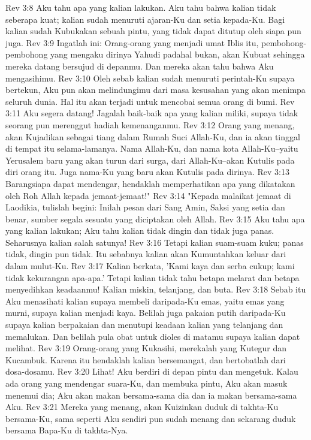 Rev 3:8  Aku tahu apa yang kalian lakukan. Aku tahu bahwa kalian tidak seberapa kuat; kalian sudah menuruti ajaran-Ku dan setia kepada-Ku. Bagi kalian sudah Kubukakan sebuah pintu, yang tidak dapat ditutup oleh siapa pun juga.
Rev 3:9  Ingatlah ini: Orang-orang yang menjadi umat Iblis itu, pembohong-pembohong yang mengaku dirinya Yahudi padahal bukan, akan Kubuat sehingga mereka datang bersujud di depanmu. Dan mereka akan tahu bahwa Aku mengasihimu.
Rev 3:10  Oleh sebab kalian sudah menuruti perintah-Ku supaya bertekun, Aku pun akan melindungimu dari masa kesusahan yang akan menimpa seluruh dunia. Hal itu akan terjadi untuk mencobai semua orang di bumi.
Rev 3:11  Aku segera datang! Jagalah baik-baik apa yang kalian miliki, supaya tidak seorang pun merenggut hadiah kemenanganmu.
Rev 3:12  Orang yang menang, akan Kujadikan sebagai tiang dalam Rumah Suci Allah-Ku, dan ia akan tinggal di tempat itu selama-lamanya. Nama Allah-Ku, dan nama kota Allah-Ku--yaitu Yerusalem baru yang akan turun dari surga, dari Allah-Ku--akan Kutulis pada diri orang itu. Juga nama-Ku yang baru akan Kutulis pada dirinya.
Rev 3:13  Barangsiapa dapat mendengar, hendaklah memperhatikan apa yang dikatakan oleh Roh Allah kepada jemaat-jemaat!"
Rev 3:14  "Kepada malaikat jemaat di Laodikia, tulislah begini: Inilah pesan dari Sang Amin, Saksi yang setia dan benar, sumber segala sesuatu yang diciptakan oleh Allah.
Rev 3:15  Aku tahu apa yang kalian lakukan; Aku tahu kalian tidak dingin dan tidak juga panas. Seharusnya kalian salah satunya!
Rev 3:16  Tetapi kalian suam-suam kuku; panas tidak, dingin pun tidak. Itu sebabnya kalian akan Kumuntahkan keluar dari dalam mulut-Ku.
Rev 3:17  Kalian berkata, 'Kami kaya dan serba cukup; kami tidak kekurangan apa-apa.' Tetapi kalian tidak tahu betapa melarat dan betapa menyedihkan keadaanmu! Kalian miskin, telanjang, dan buta.
Rev 3:18  Sebab itu Aku menasihati kalian supaya membeli daripada-Ku emas, yaitu emas yang murni, supaya kalian menjadi kaya. Belilah juga pakaian putih daripada-Ku supaya kalian berpakaian dan menutupi keadaan kalian yang telanjang dan memalukan. Dan belilah pula obat untuk dioles di matamu supaya kalian dapat melihat.
Rev 3:19  Orang-orang yang Kukasihi, merekalah yang Kutegur dan Kucambuk. Karena itu hendaklah kalian bersemangat, dan bertobatlah dari dosa-dosamu.
Rev 3:20  Lihat! Aku berdiri di depan pintu dan mengetuk. Kalau ada orang yang mendengar suara-Ku, dan membuka pintu, Aku akan masuk menemui dia; Aku akan makan bersama-sama dia dan ia makan bersama-sama Aku.
Rev 3:21  Mereka yang menang, akan Kuizinkan duduk di takhta-Ku bersama-Ku, sama seperti Aku sendiri pun sudah menang dan sekarang duduk bersama Bapa-Ku di takhta-Nya.
